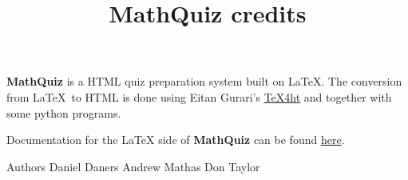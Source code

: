 \documentclass{mathquiz}
\title{MathQuiz credits}
\begin{document}
\begin{discussion}[Credits]
    \textbf{MathQuiz} is a HTML quiz preparation system built on
    \LaTeX. The conversion from \LaTeX\ to HTML is done using Eitan
    Gurari's
  \href{http://www.cis.ohio-state.edu/~gurari/TeX4ht/mn.html}{TeX4ht} 
    and together with some python programs.

    Documentation 
    for the \LaTeX{} side of \textbf{MathQuiz} can be found 
    \href{http://www.maths.usyd.edu.au:8000/u/MOW/MathQuiz/doc/mathquiz-manual.html}{here}.

    Authors
     \qquad   Daniel Daners\newline
     \qquad   Andrew Mathas\newline
     \qquad   Don Taylor
\end{discussion}
\end{document}
